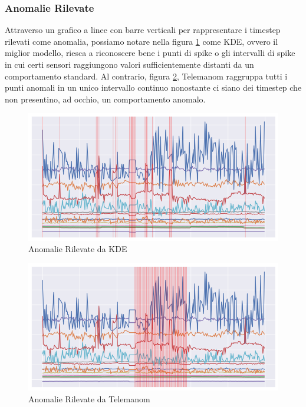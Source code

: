 \subsubsection{Anomalie Rilevate}
Attraverso un grafico a linee con barre verticali per rappresentare i timestep rilevati come anomalia, possiamo notare nella figura \ref{kde} come KDE, ovvero il miglior modello, riesca a riconoscere bene i punti di spike o gli intervalli di spike in cui certi sensori raggiungono valori sufficientemente distanti da un comportamento standard. Al contrario, figura \ref{worst_clf}, Telemanom raggruppa tutti i punti anomali in un unico intervallo continuo nonostante ci siano dei timestep che non presentino, ad occhio, un comportamento anomalo.

\begin{figure}[t]
	\centering
	\includegraphics[width=14cm, scale=1]{images/kde}
	\caption{Anomalie Rilevate da KDE}
	\label{kde}
	
\end{figure}

\begin{figure}[t]
	\centering
	\includegraphics[width=14cm, scale=1]{images/worst_clf}
	\caption{Anomalie Rilevate da Telemanom}
	\label{worst_clf}
	
\end{figure}

